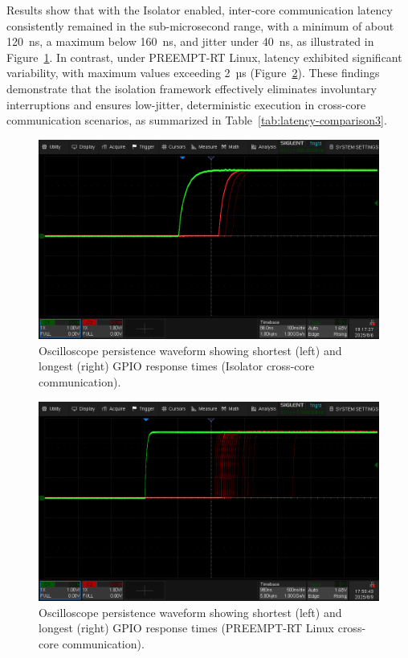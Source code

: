 \documentclass[letterpaper]{article}
\begin{document}
Results show that with the Isolator enabled, inter-core communication latency consistently remained
in the sub-microsecond range, with a minimum of about 120~ns, a maximum below 160~ns, and jitter
under 40~ns, as illustrated in Figure~\ref{fig:islcrossgpio}. In contrast, under PREEMPT-RT Linux,
latency exhibited significant variability, with maximum values exceeding 2~µs
(Figure~\ref{fig:linuxcrossgpio}). These findings demonstrate that the isolation framework effectively
eliminates involuntary interruptions and ensures low-jitter, deterministic execution in cross-core
communication scenarios, as summarized in Table~\ref{tab:latency-comparison3}.

\begin{figure}[h]
  \centering
  \includegraphics[width=0.8\linewidth]{figures/islcrosscoreintgpio.png}
  \caption{Oscilloscope persistence waveform showing shortest (left) and longest (right) GPIO response times (Isolator cross-core communication).}
  \label{fig:islcrossgpio}
\end{figure}

\begin{figure}[h]
  \centering
  \includegraphics[width=0.8\linewidth]{figures/linuxcrosscoreintgpio.png}
  \caption{Oscilloscope persistence waveform showing shortest (left) and longest (right) GPIO response times (PREEMPT-RT Linux cross-core communication).}
  \label{fig:linuxcrossgpio}
\end{figure}
\end{document}
